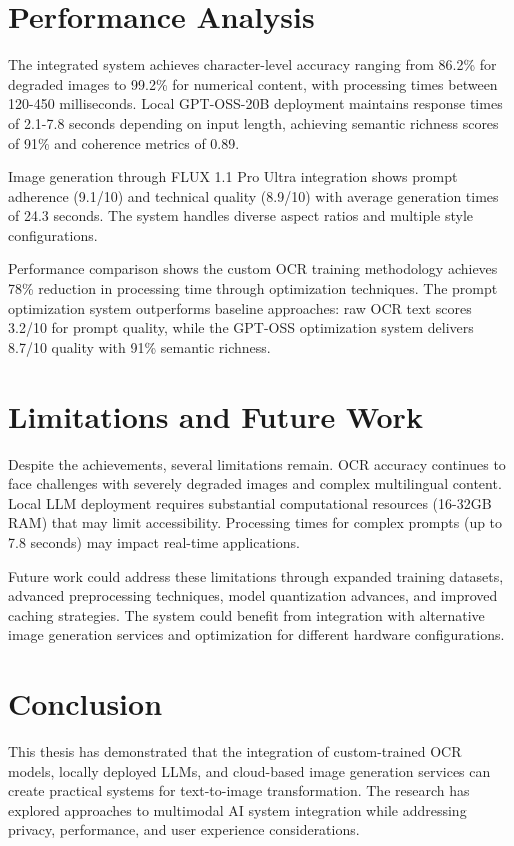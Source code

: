 \section{Performance Analysis}

The integrated system achieves character-level accuracy ranging from 86.2\% for degraded images to 99.2\% for numerical content, with processing times between 120-450 milliseconds. Local GPT-OSS-20B deployment maintains response times of 2.1-7.8 seconds depending on input length, achieving semantic richness scores of 91\% and coherence metrics of 0.89.

Image generation through FLUX 1.1 Pro Ultra integration shows prompt adherence (9.1/10) and technical quality (8.9/10) with average generation times of 24.3 seconds. The system handles diverse aspect ratios and multiple style configurations.

Performance comparison shows the custom OCR training methodology achieves 78\% reduction in processing time through optimization techniques. The prompt optimization system outperforms baseline approaches: raw OCR text scores 3.2/10 for prompt quality, while the GPT-OSS optimization system delivers 8.7/10 quality with 91\% semantic richness.

\section{Limitations and Future Work}

Despite the achievements, several limitations remain. OCR accuracy continues to face challenges with severely degraded images and complex multilingual content. Local LLM deployment requires substantial computational resources (16-32GB RAM) that may limit accessibility. Processing times for complex prompts (up to 7.8 seconds) may impact real-time applications.

Future work could address these limitations through expanded training datasets, advanced preprocessing techniques, model quantization advances, and improved caching strategies. The system could benefit from integration with alternative image generation services and optimization for different hardware configurations.


\section{Conclusion}

This thesis has demonstrated that the integration of custom-trained OCR models, locally deployed LLMs, and cloud-based image generation services can create practical systems for text-to-image transformation. The research has explored approaches to multimodal AI system integration while addressing privacy, performance, and user experience considerations.

